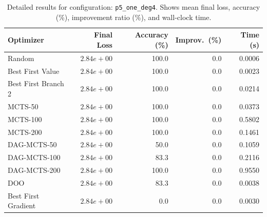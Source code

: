 \begin{table}[H]
\centering
\caption{Detailed results for configuration: \texttt{p5\_one\_deg4}. Shows mean final loss, accuracy (\%), improvement ratio (\%), and wall-clock time.}
\label{tab:funclearn-detail-24}
\begin{tabular}{lrrrr}
\toprule
Optimizer & Final Loss & Accuracy (\%) & Improv.~(\%) & Time (s) \\
\midrule
Random & \textbf{$2.84e+00$} & 100.0 & 0.0 & 0.0006 \\
\hline
Best First Value & \textbf{$2.84e+00$} & 100.0 & 0.0 & 0.0023 \\
\hline
Best First Branch 2 & \textbf{$2.84e+00$} & 100.0 & 0.0 & 0.0214 \\
\hline
MCTS-50 & \textbf{$2.84e+00$} & 100.0 & 0.0 & 0.0373 \\
\hline
MCTS-100 & \textbf{$2.84e+00$} & 100.0 & 0.0 & 0.5802 \\
\hline
MCTS-200 & \textbf{$2.84e+00$} & 100.0 & 0.0 & 0.1461 \\
\hline
DAG-MCTS-50 & \textbf{$2.84e+00$} & 50.0 & 0.0 & 0.1059 \\
\hline
DAG-MCTS-100 & \textbf{$2.84e+00$} & 83.3 & 0.0 & 0.2116 \\
\hline
DAG-MCTS-200 & \textbf{$2.84e+00$} & 100.0 & 0.0 & 0.9550 \\
\hline
DOO & \textbf{$2.84e+00$} & 83.3 & 0.0 & 0.0038 \\
\hline
Best First Gradient & \textbf{$2.84e+00$} & 0.0 & 0.0 & 0.0030 \\
\bottomrule
\end{tabular}
\end{table}

